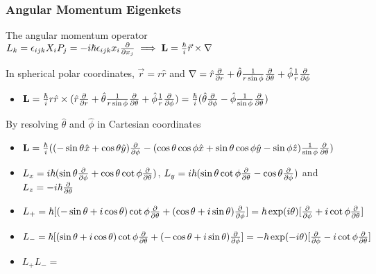 \documentclass[8pt,t,mathserif,aspectratio=169]{beamer}
\begin{document}
\begin{frame}
  \frametitle{Angular Momentum Eigenkets}
  \vspace{1mm}
  The angular momentum operator $L_k = \epsilon_{ijk} X_i P_j = -i \hbar \epsilon_{ijk} x_i {\partial \over \partial x_j} \implies \textbf{L} = {\hbar \over i} \vec{r} \times \nabla$
  
  In spherical polar coordinates, $\vec{r} = r \hat{r}$ and $\nabla = \hat{r} {\partial \over \partial r} + \hat{\theta} {1 \over r \sin{\phi}} {\partial \over \partial \theta} + \hat{\phi} {1 \over r}{\partial \over \partial \phi}$
  \begin{itemize}
    \item $\textbf{L} = {\hbar \over i} r \hat{r} \times (\hat{r} {\partial \over \partial r} + \hat{\theta} {1 \over r \sin{\phi}} {\partial \over \partial \theta} + \hat{\phi} {1 \over r}{\partial \over \partial \phi}) = {\hbar \over i} (\hat{\theta} {\partial \over \partial \phi} - \hat{\phi} {1 \over \sin{\phi}} {\partial \over \partial \theta})$
  \end{itemize}
  By resolving $\hat{\theta}$ and $\hat{\phi}$ in Cartesian coordinates
  \begin{itemize}
    \item $\textbf{L} = {\hbar \over i} ((-\sin{\theta} \hat{x} + \cos{\theta} \hat{y}) {\partial \over \partial \phi} - (\cos{\theta} \cos{\phi} \hat{x} + \sin{\theta} \cos{\phi} \hat{y} - \sin{\phi} \hat{z}) {1 \over \sin{\phi}} {\partial \over \partial \theta})$
    \item $L_x = i \hbar (\sin{\theta} {\partial \over \partial \phi} + \cos{\theta} \cot{\phi} {\partial \over \partial \theta})$, $L_y = i \hbar (\sin{\theta} \cot{\phi} {\partial \over \partial \theta} -\cos{\theta} {\partial \over \partial \phi})$ and $L_z = {-i \hbar} {\partial \over \partial \theta}$
    \item $L_{+} = \hbar [(-\sin{\theta} + i\cos{\theta}) \cot{\phi} {\partial \over \partial \theta} + (\cos{\theta} + i \sin{\theta}) {\partial \over \partial \phi}] = \hbar \exp(i \theta) [{\partial \over \partial \phi} + i \cot{\phi} {\partial \over \partial \theta}]$
    \item $L_{-} = \hbar [(\sin{\theta} + i\cos{\theta}) \cot{\phi} {\partial \over \partial \theta} + (-\cos{\theta} + i \sin{\theta}) {\partial \over \partial \phi}] = -\hbar \exp(-i \theta) [{\partial \over \partial \phi} - i \cot{\phi} {\partial \over \partial \theta}]$
    \item $L_{+} L_{-} = $
  \end{itemize}
\end{frame}
\end{document}
